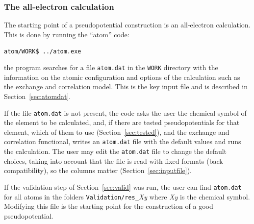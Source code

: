 \documentclass[11pt]{article}
\begin{document}
\subsubsection{The all-electron calculation}
\label{sec:run-ae}

The starting point of a pseudopotential construction is an all-electron calculation.
This is done by running the ``atom'' code:

\noindent\texttt{atom/WORK\$ ../atom.exe}

the program searches for a file \texttt{atom.dat} in the \texttt{WORK} directory with the information on the atomic
configuration and options of the calculation such as the exchange and correlation model.
This is the key input file and is described in Section~\ref{sec:atomdat}.

If the file \texttt{atom.dat} is not present, the code asks the user the chemical symbol of the element to be calculated,
and, if there are tested pseudopotentials for that element, which of them to use (Section~\ref{sec:tested}),
and the exchange and correlation functional,
writes an \texttt{atom.dat} file with the default values and runs the calculation.
The user may edit the \texttt{atom.dat} file to change the default choices, taking into account that the
file is read with fixed formats (back-compatibility), so the columns matter (Section~\ref{sec:inputfile}).

If the validation step of Section~\ref{sec:valid} was run, the user can find \texttt{atom.dat}
for all atoms in the folders \texttt{Validation/res\_}\textit{Xy} where \textit{Xy}
is the chemical symbol.  Modifying this file is the starting point for the construction of a good pseudopotential.
\end{document}
